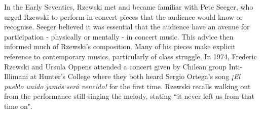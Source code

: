 \documentclass[12pt, letterpaper]{article}
\begin{document}
In the Early Seventies, Rzewski met and became familiar with Pete Seeger, who urged Rzewski
to perform in concert pieces that the audience would know or recognise. Seeger believed
it was essential that the audience have an avenue for participation - physically or mentally -
in concert music. \autocite*{rzewski-plays-rzewski} This advice then informed much of Rzewski's
composition. Many of his pieces make explicit reference to contemporary musics, particularly of
class struggle. In 1974, Frederic Rzewski and Ursula Oppens attended a concert given by Chilean
group Inti-Illimani at Hunter's College where they both heard Sergio Ortega's song
\textit{¡El pueblo unido jamás será vencido!} for the first time. Rzewski recalls walking out from the
performance still singing the melody, stating ``it never left us from that time
on". \autocite*{rzewski-plays-rzewski}
\clearpage{}

\nocite{*}
\printbibliography
\end{document}
